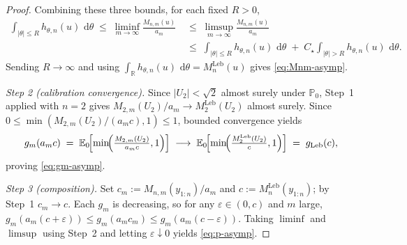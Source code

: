 \documentclass[12pt, a4paper]{report}
\newcommand{\E}{\mathbb{E}}
\newcommand{\Prob}{\mathbb{P}}
\newcommand{\dd}{\,\mathrm{d}}
\newcommand{\Leb}{\mathrm{Leb}}
\newcommand{\1}{\mathbf{1}}
\begin{document}
\begin{proof}
Combining these three bounds, for each fixed $R>0$,
\begin{align*}
   \int_{|\theta|\leq R}h_{\theta,n}(u)\,\dd\theta
   \;\leq\; \liminf_{m\to\infty}\frac{M_{n,m}(u)}{a_m}
   &\;\leq\; \limsup_{m\to\infty}\frac{M_{n,m}(u)}{a_m}\\
   & \;\leq\; \int_{|\theta|\leq R}h_{\theta,n}(u)\,\dd\theta
   \;+\; C_\star\!\int_{|\theta|>R}h_{\theta,n}(u)\,\dd\theta.
\end{align*}
Sending $R\to\infty$ and using $\int_\mathbb{R} h_{\theta,n}(u)\,\dd\theta
= M_n^{\Leb}(u)$ gives \eqref{eq:Mnm-asymp}.

\emph{Step 2 (calibration convergence).}
Since \(|U_2|<\sqrt 2\) almost surely under \(\Prob_0\), Step~1 applied with \(n=2\) gives
\(M_{2,m}(U_2)/a_m\to M_2^{\Leb}(U_2)\) almost surely. Since \(0\leq\min(M_{2,m}(U_2)/(a_m c),1)\leq 1\), bounded convergence yields
\[
  g_m(a_m c)
  \;=\;\E_0\!\Bigl[\min\!\Bigl(\tfrac{M_{2,m}(U_2)}{a_mc},1\Bigr)\Bigr]
  \;\longrightarrow\;
  \E_0\!\Bigl[\min\!\Bigl(\tfrac{M_2^{\Leb}(U_2)}{c},1\Bigr)\Bigr]
  \;=\;g_{\Leb}(c),
\]
proving \eqref{eq:gm-asymp}.

\emph{Step 3 (composition).}
Set \(c_m:=M_{n,m}(y_{1:n})/a_m\) and \(c:=M_n^{\Leb}(y_{1:n})\); by Step~1 \(c_m\to c\). Each \(g_m\) is decreasing, so for any \(\varepsilon\in(0,c)\) and \(m\) large, \(g_m(a_m(c+\varepsilon))\leq g_m(a_m c_m)\leq g_m(a_m(c-\varepsilon))\). Taking \(\liminf\) and \(\limsup\) using Step~2 and letting \(\varepsilon\downarrow 0\) yields \eqref{eq:p-asymp}.
\end{proof}
\end{document}
